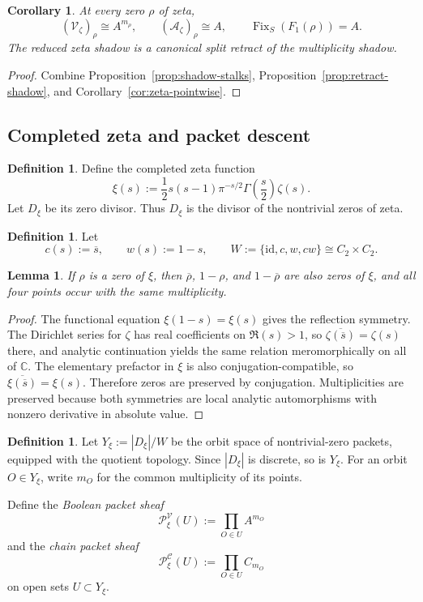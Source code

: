 \documentclass[11pt,a4paper]{article}
\numberwithin{equation}{section}
\newtheorem{lemma}[theorem]{Lemma}
\newtheorem{corollary}[theorem]{Corollary}
\theoremstyle{definition}
\newtheorem{definition}[theorem]{Definition}
\theoremstyle{remark}
\DeclareMathOperator{\Fix}{Fix}
\newcommand{\CC}{\mathbb C}
\newcommand{\cV}{\mathcal V}
\newcommand{\cA}{\mathcal A}
\newcommand{\cC}{\mathcal C}
\begin{document}
\begin{corollary}\label{cor:zeta-shadow-sheaves}
At every zero $\rho$ of zeta,
\[
(\cV_\zeta)_\rho\cong A^{m_\rho},
\qquad
(\cA_\zeta)_\rho\cong A,
\qquad
\Fix_S(F_1(\rho))=A.
\]
The reduced zeta shadow is a canonical split retract of the multiplicity shadow.
\end{corollary}

\begin{proof}
Combine Proposition~\ref{prop:shadow-stalks}, Proposition~\ref{prop:retract-shadow}, and Corollary~\ref{cor:zeta-pointwise}.
\end{proof}

\subsection{Completed zeta and packet descent}

\begin{definition}
Define the completed zeta function
\[
\xi(s):=\frac12 s(s-1)\pi^{-s/2}\Gamma\!\left(\frac s2\right)\zeta(s).
\]
Let $D_\xi$ be its zero divisor.  Thus $D_\xi$ is the divisor of the nontrivial zeros of zeta.
\end{definition}

\begin{definition}
Let
\[
c(s):=\overline s,
\qquad
w(s):=1-s,
\qquad
W:=\{\mathrm{id},c,w,cw\}\cong C_2\times C_2.
\]
\end{definition}

\begin{lemma}\label{lem:xi-symmetry-multiplicity}
If $\rho$ is a zero of $\xi$, then $\overline\rho$, $1-\rho$, and $1-\overline\rho$ are also zeros of $\xi$, and all four points occur with the same multiplicity.
\end{lemma}

\begin{proof}
The functional equation $\xi(1-s)=\xi(s)$ gives the reflection symmetry.  The Dirichlet series for $\zeta$ has real coefficients on $\Re(s)>1$, so $\overline{\zeta(\overline s)}=\zeta(s)$ there, and analytic continuation yields the same relation meromorphically on all of $\CC$.  The elementary prefactor in $\xi$ is also conjugation-compatible, so $\overline{\xi(\overline s)}=\xi(s)$.  Therefore zeros are preserved by conjugation.  Multiplicities are preserved because both symmetries are local analytic automorphisms with nonzero derivative in absolute value.
\end{proof}

\begin{definition}
Let $Y_\xi:=|D_\xi|/W$ be the orbit space of nontrivial-zero packets, equipped with the quotient topology.  Since $|D_\xi|$ is discrete, so is $Y_\xi$.  For an orbit $O\in Y_\xi$, write $m_O$ for the common multiplicity of its points.

Define the \emph{Boolean packet sheaf}
\[
\mathcal P_\xi^{\cV}(U):=\prod_{O\in U}A^{m_O}
\]
and the \emph{chain packet sheaf}
\[
\mathcal P_\xi^{\cC}(U):=\prod_{O\in U}C_{m_O}
\]
on open sets $U\subset Y_\xi$.
\end{definition}
\end{document}

